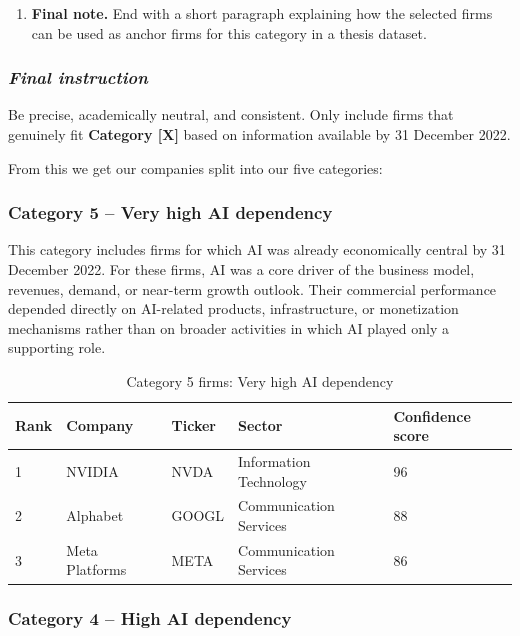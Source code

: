 \documentclass{article}
\begin{document}
{\begin{enumerate}
    \item \textbf{Final note.} End with a short paragraph explaining how the selected firms can be used as anchor firms for this category in a thesis dataset.
\end{enumerate}

\subsubsection*{\textit{Final instruction}}

Be precise, academically neutral, and consistent. Only include firms that genuinely fit \textbf{Category [X]} based on information available by 31 December 2022.

}

From this we get our companies split into our five categories:

\subsubsection*{Category 5 -- Very high AI dependency}

This category includes firms for which AI was already economically central by 31 December 2022. For these firms, AI was a core driver of the business model, revenues, demand, or near-term growth outlook. Their commercial performance depended directly on AI-related products, infrastructure, or monetization mechanisms rather than on broader activities in which AI played only a supporting role.

\begin{table}[H]
\centering
\caption{Category 5 firms: Very high AI dependency}
\small
\renewcommand{\arraystretch}{1.15}
\begin{tabularx}{\textwidth}{@{} C{1.1cm} L{4.2cm} C{1.6cm} L{4.3cm} C{2.3cm} @{}}
\toprule
\textbf{Rank} & \textbf{Company} & \textbf{Ticker} & \textbf{Sector} & \textbf{Confidence score} \\
 & NVIDIA & NVDA & Information Technology & 96 \\
2 & Alphabet & GOOGL & Communication Services & 88 \\
3 & Meta Platforms & META & Communication Services & 86 \\
\bottomrule
\end{tabularx}
\label{tab:category5}
\end{table}

\subsubsection*{Category 4 -- High AI dependency}
\end{document}
